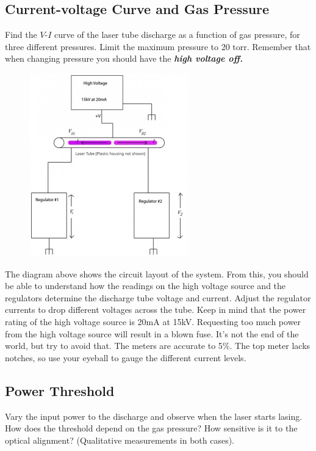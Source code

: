 \documentclass{../lab}
\begin{document}
\subsection{Current-voltage Curve and Gas Pressure}

Find the $V$-$I$ curve of the laser tube discharge as a function of gas pressure, for three different pressures. Limit the maximum pressure to 20 torr. Remember that when changing pressure you should have the \emph{\textbf{high voltage off.}}

\begin{figure}[h]
\centering
    \href{http://experimentationlab.berkeley.edu/sites/default/files/upimages/2_lasercircuitpic_small.jpg}{\includegraphics[width=0.5\linewidth]{images/2_lasercircuitpic_small.jpg}}
    \caption{}
\end{figure}

The diagram above shows the circuit layout of the system. From this, you should be able to understand how the readings on the high voltage source and the regulators determine the discharge tube voltage and current. Adjust the regulator currents to drop different voltages across the tube. Keep in mind that the power rating of the high voltage source is 20mA at 15kV. Requesting too much power from the high voltage source will result in a blown fuse. It's not the end of the world, but try to avoid that. The meters are accurate to 5\%. The top meter lacks notches, so use your eyeball to gauge the different current levels.

\subsection{Power Threshold}

Vary the input power to the discharge and observe when the laser starts lasing. How does the threshold depend on the gas pressure? How sensitive is it to the optical alignment? (Qualitative measurements in both cases).
\end{document}
